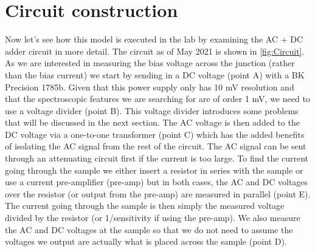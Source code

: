 \section{Circuit construction}
Now let's see how this model is executed in the lab by examining the AC + DC adder circuit in more detail. The circuit as of May 2021 is shown in \ref{fig:Circuit}. As we are interested in measuring the bias voltage across the junction (rather than the bias current) we start by sending in a DC voltage (point A) with a BK Precision 1785b. Given that this power supply only has 10 mV resolution and that the spectroscopic features we are searching for are of order 1 mV, we need to use a voltage divider (point B). This voltage divider introduces some problems that will be discussed in the next section. The AC voltage is then added to the DC voltage via a one-to-one transformer (point C) which has the added benefits of isolating the AC signal from the rest of the circuit. The AC signal can be sent through an attenuating circuit first if the current is too large. To find the current going through the sample we either insert a resistor in series with the sample or use a current pre-amplifier (pre-amp) but in both cases, the AC and DC voltages over the resistor (or output from the pre-amp) are measured in parallel (point E). The current going through the sample is then simply the measured voltage divided by the resistor (or 1/sensitivity if using the pre-amp). We also measure the AC and DC voltages at the sample so that we do not need to assume the voltages we output are actually what is placed across the sample (point D).\par
